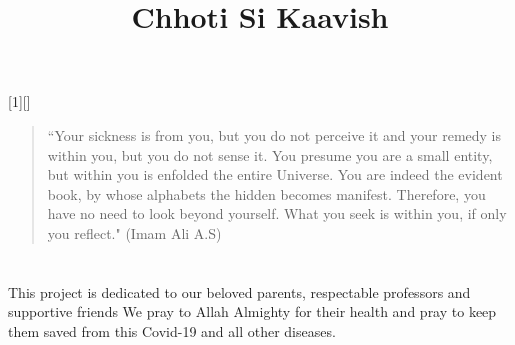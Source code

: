 \documentclass[12pt,twosided]{report}
\title{Chhoti Si Kaavish}
\begin{document}
[1][]
{
\pythonstyle
\lstset{#1}
}
{}

\newcommand\pythonexternal[2][]{{
\pythonstyle
}}

\newcommand\pythoninline[1]{{\pythonstyle\lstinline!#1!}}



\newpage

\vspace*{\fill} 
\begin{quote} 

\begin{center}
    ``Your sickness is from you, but you do not perceive it and your remedy is within you, but you do not sense it. You presume you are a small entity, but within you is enfolded the entire Universe. You are indeed the evident book, by whose alphabets the hidden becomes manifest. Therefore, you have no need to look beyond yourself. What you seek is within you, if only you reflect." (Imam Ali A.S)
\end{center}
    
    
\end{quote}
\vspace*{\fill}


\chapter*{}
\vspace*{\fill}
\begin{center}
    This project is dedicated to our beloved parents, respectable professors and supportive friends We pray to Allah Almighty for their health and pray to keep them saved from this Covid-19 and all other diseases. 
\end{center}

\vspace*{\fill}
\end{document}
